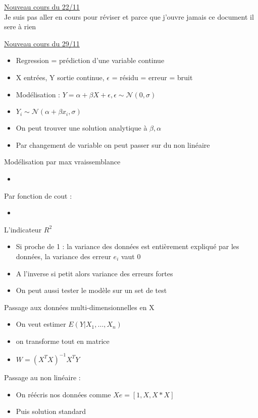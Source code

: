\documentclass{article}
\theoremstyle{plain}%
\theoremstyle{definition}
\theoremstyle{remark}
\begin{document}
\underline{Nouveau cours du 22/11} \\
Je suis pas aller en cours pour réviser et parce que j'ouvre jamais ce document il sere à rien

\underline{Nouveau cours du 29/11} \\
\begin{itemize}
    \item Regression = prédiction d'une variable continue 
    \item X entrées, Y sortie continue, $ \epsilon  $ = résidu = erreur = bruit
    \item Modélisation : $ Y = \alpha + \beta X + \epsilon, \epsilon \sim \mathcal{N}(0, \sigma )  $ 
    \item $ Y_i \sim \mathcal{N}(\alpha + \beta x_i, \sigma ) $ 
    \item On peut trouver une solution analytique à $ \beta, \alpha  $ 
    \item Par changement de variable on peut passer sur du non linéaire
\end{itemize}
Modélisation par max vraissemblance
\begin{itemize}
    \item 
\end{itemize}
Par fonction de cout : 
\begin{itemize}
    \item 
\end{itemize}
L'indicateur $ R^2 $ \begin{itemize}
    \item Si proche de 1 : la variance des données est entièrement expliqué par les données, la variance des erreur $ e_i $ vaut 0
    \item A l'inverse si petit alors variance des erreurs fortes
    \item On peut aussi tester le modèle sur un set de test
\end{itemize}
Passage aux données multi-dimensionnelles en X
\begin{itemize}
    \item On veut estimer $ E(Y|X_1, \dots, X_n) $ 
    \item on transforme tout en matrice
    \item $ W = (X^T X)^{-1} X^T Y $ 
\end{itemize}
Passage au non linéaire : \begin{itemize}
    \item On réécris nos données comme $ Xe = [1, X, X*X] $ 
    \item Puis solution standard
\end{itemize}
\end{document}
